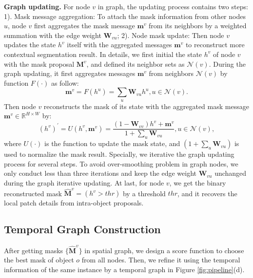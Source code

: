 \documentclass[letterpaper]{article} %
\begin{document}
\noindent \textbf{Graph updating.}
For node $v$ in graph, the updating process contains two steps: 1). Mask message aggregation: To attach the mask information from other nodes $u$, node $v$ first aggregates the mask message $\bm{m}^v$ from its neighbors by a weighted summation with the edge weight $\bm{W}_{vu}$; 2). Node mask update: Then node $v$ updates the state $h^v$ itself with the aggregated messages $\bm{m}^v$ to reconstruct more contextual segmentation result.
In details, we first initial the state $h^v$ of node $v$ with the mask proposal $\bm{M}^{v}$, and defined its neighbor sets as $\mathcal{N}(v)$. During the graph updating, it first aggregates messages $\bm{m}^v$ from neighbors $\mathcal{N}(v)$ by function $F(\cdot)$ as follow:
\begin{equation}
    \bm{m}^v = F(h^u) = \sum_u \bm{W}_{vu}h^u, u\in \mathcal{N}(v).
\end{equation}
Then node $v$ reconstructs the mask of its state with the aggregated mask message $\bm{m}^v \in \mathbb{R}^{H\times W}$ by:
\begin{equation}
    (h^v)^{'} = U(h^{v}, \bm{m}^v) = \frac{(1-\bm{W}_{vv})h^{v}+\bm{m}^v}{1+\sum_u \bm{W}_{vu}} , u\in \mathcal{N}(v),
\end{equation}
where $U(\cdot)$ is the function to update the mask state, and $(1+\sum_{u}\bm{W}_{vu})$ is used to normalize the mask result.
Specially, we iterative the graph updating process for several steps.
To avoid over-smoothing problem \cite{li2018deeper} in graph nodes, we only conduct less than three iterations and keep the edge weight $\bm{W}_{vu}$ unchanged during the graph iterative updating.
At last, for node $v$, we get the binary reconstructed mask $\widehat{\bm{M}}^{v} = (h^v>thr)$ by a threshold $thr$, and it recovers the local patch details from intra-object proposals.

\subsection{Temporal Graph Construction}
After getting masks $\{\widehat{\bm{M}}^{v}\}$ in spatial graph, we design a score function to choose the best mask of object $o$ from all nodes. Then, we refine it using the temporal information of the same instance by a temporal graph in Figure \ref{fig:pipeline}(d).
\end{document}
